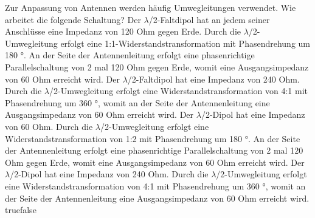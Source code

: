    {Zur Anpassung von Antennen werden häufig Umwegleitungen verwendet. Wie arbeitet die folgende Schaltung?}
    {Der $\lambda$/2-Faltdipol hat an jedem seiner Anschlüsse eine Impedanz von 120 Ohm gegen Erde. Durch die $\lambda$/2-Umwegleitung erfolgt eine 1:1-Widerstandstransformation mit Phasendrehung um 180 °. An der Seite der Antennenleitung erfolgt eine phasenrichtige Parallelschaltung von 2 mal 120 Ohm gegen Erde, womit eine Ausgangsimpedanz von 60 Ohm erreicht wird.
}
    {Der $\lambda$/2-Faltdipol hat eine Impedanz von 240 Ohm. Durch die $\lambda$/2-Umwegleitung erfolgt eine Widerstandstransformation von 4:1 mit Phasendrehung um 360 °, womit an der Seite der Antennenleitung eine Ausgangsimpedanz von 60 Ohm erreicht wird.}
    {Der $\lambda$/2-Dipol hat eine Impedanz von 60 Ohm. Durch die $\lambda$/2-Umwegleitung erfolgt eine Widerstandstransformation von 1:2 mit Phasendrehung um 180 °. An der Seite der Antennenleitung erfolgt eine phasenrichtige Parallelschaltung von 2 mal 120 Ohm gegen Erde, womit eine Ausgangsimpedanz von 60 Ohm erreicht wird.}
    {Der $\lambda$/2-Dipol hat eine Impedanz von 240 Ohm. Durch die $\lambda$/2-Umwegleitung erfolgt eine Widerstandstransformation von 4:1 mit Phasendrehung um 360 °, womit an der Seite der Antennenleitung eine Ausgangsimpedanz von 60 Ohm erreicht wird.}
    {true}{false}